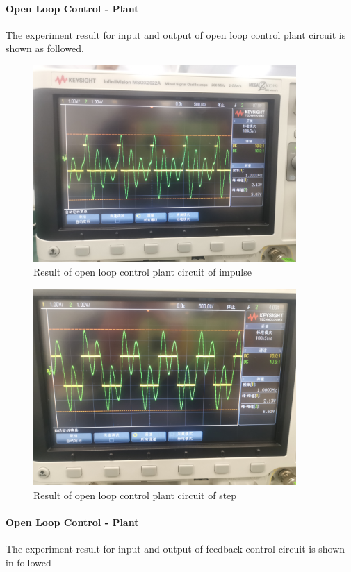 \documentclass[a4paper]{article}
\begin{document}
    \paragraph{Open Loop Control - Plant}
    The experiment result for input and output of open loop control plant circuit is shown as followed.

    \begin{figure}[H]
        \centering
        \includegraphics[width=10cm]{pulse1.jpg}
        \caption{Result of open loop control plant circuit of impulse}
    \end{figure}

    \begin{figure}[H]
        \centering
        \includegraphics[width=10cm]{rect1.jpg}
        \caption{Result of open loop control plant circuit of step}
    \end{figure}

    \paragraph{Open Loop Control - Plant}
    The experiment result for input and output of feedback control circuit is shown in followed
\end{document}
